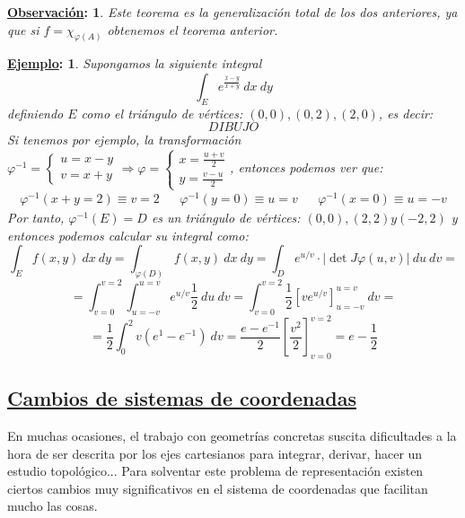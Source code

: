 \documentclass[10pt,a4paper,openright]{book}
\theoremstyle{break}
\newtheorem*{obs}{\underline{Observación}:}
\newtheorem*{ej}{\underline{Ejemplo}:}
\newcommand{\dif}[1]{\ d#1}
\begin{document}
\begin{obs}
Este teorema es la generalización total de los dos anteriores, ya que si $f = \chi_{\varphi \left(A\right)}$ obtenemos el teorema anterior.
\end{obs}

\begin{ej}
Supongamos la siguiente integral $$\int_E e^{\frac{x - y}{x + y}} \dif{x} \dif{y}$$
definiendo $E$ como el triángulo de vértices: $\left(0, 0\right), \left(0, 2\right), \left(2, 0\right)$, es decir:
$$DIBUJO$$
Si tenemos por ejemplo, la transformación $\varphi^{-1} = \begin{cases} u = x - y\\ v = x + y 
\end{cases} \Rightarrow \varphi = \begin{cases} x = \frac{u + v}{2}\\ y = \frac{v - u}{2} \end{cases}$, entonces podemos ver que:
\begin{align*}
\varphi^{-1} \left(x + y = 2\right) \equiv v = 2 & & \varphi^{-1} \left(y = 0\right)\equiv u = v & & \varphi^{-1} \left(x = 0\right)\equiv u = -v
\end{align*}
Por tanto, $\varphi^{-1} \left(E\right) = D$ es un triángulo de vértices: $\left(0, 0\right), \left(2, 2\right) y \left(-2, 2\right)$ y entonces podemos calcular su integral como:
$$\int_E f \left(x, y\right) \dif{x} \dif{y} = \int_{\varphi \left(D\right)} f \left(x, y\right) \dif{x}\dif{y} = \int_D e^{u/v}\cdot \lvert \det J \varphi \left(u, v\right) \rvert \dif{u} \dif{v} =$$
$$= \int_{v = 0}^{v = 2} \int_{u = -v}^{u = v} e^{u/v} \frac{1}{2} \dif{u} \dif{v} = \int_{v = 0}^{v = 2} \frac{1}{2} \left[v e^{u/v}\right]_{u = -v}^{u = v} \dif{v} = $$
$$= \frac{1}{2} \int_0^2 v \left(e^{1} - e^{-1}\right) \dif{v} = \frac{e - e^{-1}}{2} \left[\frac{v^2}{2}\right]_{v = 0}^{v = 2} = e - \frac{1}{2} $$
\end{ej}

\subsection*{\underline{Cambios de sistemas de coordenadas}}
En muchas ocasiones, el trabajo con geometrías concretas suscita dificultades a la hora de ser descrita por los ejes cartesianos para integrar, derivar, hacer un estudio topológico... Para solventar este problema de representación existen ciertos cambios muy significativos en el sistema de coordenadas que facilitan mucho las cosas.
\end{document}
